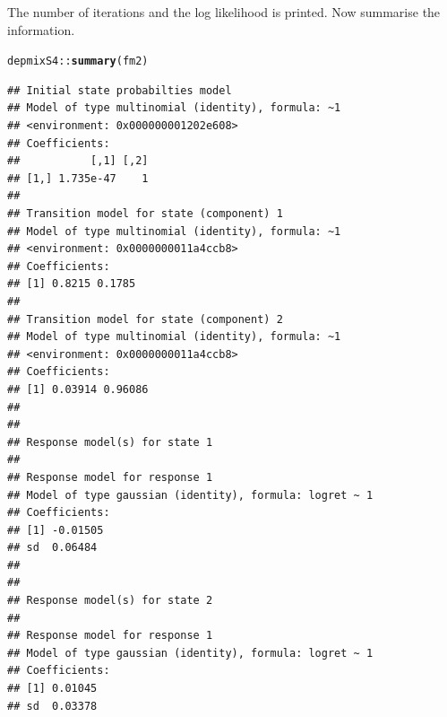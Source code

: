 \documentclass{article}\usepackage{graphicx, color}
\makeatletter
\newcommand{\hlfunctioncall}[1]{\textcolor[rgb]{0.501960784313725,0,0.329411764705882}{\textbf{#1}}}%
\newenvironment{kframe}{%
 \def\at@end@of@kframe{}%
 \ifinner\ifhmode%
  \def\at@end@of@kframe{\end{minipage}}%
  \begin{minipage}{\columnwidth}%
 \fi\fi%
 \def\FrameCommand##1{\hskip\@totalleftmargin \hskip-\fboxsep
 \colorbox{shadecolor}{##1}\hskip-\fboxsep
     \hskip-\linewidth \hskip-\@totalleftmargin \hskip\columnwidth}%
 \MakeFramed {\advance\hsize-\width
   \@totalleftmargin\z@ \linewidth\hsize
   \@setminipage}}%
 {\par\unskip\endMakeFramed%
 \at@end@of@kframe}
\newenvironment{knitrout}{}{} %
\makeatother
\begin{document}
The number of iterations and the log likelihood is printed.  Now summarise the information. 
\begin{knitrout}
\color{fgcolor}\begin{kframe}
\begin{alltt}
depmixS4::\hlfunctioncall{summary}(fm2)
\end{alltt}
\begin{verbatim}
## Initial state probabilties model 
## Model of type multinomial (identity), formula: ~1
## <environment: 0x000000001202e608>
## Coefficients: 
##           [,1] [,2]
## [1,] 1.735e-47    1
## 
## Transition model for state (component) 1 
## Model of type multinomial (identity), formula: ~1
## <environment: 0x0000000011a4ccb8>
## Coefficients: 
## [1] 0.8215 0.1785
## 
## Transition model for state (component) 2 
## Model of type multinomial (identity), formula: ~1
## <environment: 0x0000000011a4ccb8>
## Coefficients: 
## [1] 0.03914 0.96086
## 
## 
## Response model(s) for state 1 
## 
## Response model for response 1 
## Model of type gaussian (identity), formula: logret ~ 1
## Coefficients: 
## [1] -0.01505
## sd  0.06484 
## 
## 
## Response model(s) for state 2 
## 
## Response model for response 1 
## Model of type gaussian (identity), formula: logret ~ 1
## Coefficients: 
## [1] 0.01045
## sd  0.03378
\end{verbatim}
\end{kframe}
\end{knitrout}
\end{document}
